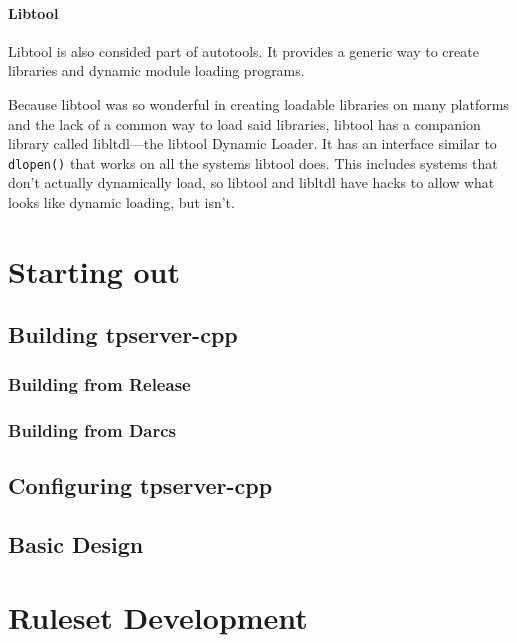 \documentclass[a4paper,11pt]{report}
\begin{document}
\subsection{Libtool}
\label{sec:libtool}

Libtool is also consided part of autotools. It provides a generic way to create libraries and dynamic module loading programs.

Because libtool was so wonderful in creating loadable libraries on many platforms and the lack of a common way to load said libraries, libtool has a companion library called libltdl---the libtool Dynamic Loader.  It has an interface similar to \texttt{dlopen()} that works on all the systems libtool does. This includes systems that don't actually dynamically load, so libtool and libltdl have hacks to allow what looks like dynamic loading, but isn't.


\part{Starting out}
\label{part:starting}

\chapter{Building tpserver-cpp}
\label{chap:building-tpserver-cpp}

\section{Building from Release}
\label{sec:release-build}


\section{Building from Darcs}
\label{sec:build-darcs}


\chapter{Configuring tpserver-cpp}
\label{chap:configure}


\chapter{Basic Design}
\label{chap:design-basic}


\part{Ruleset Development}
\label{part:ruleset-dev}
\end{document}
